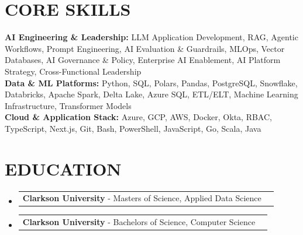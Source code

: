 \documentclass[letterpaper,11pt]{article}
\makeatletter
\newcommand{\educationSubheading}[3]{
  \vspace{-2pt}\item
    \begin{tabular*}{0.98\textwidth}[t]{l@{\extracolsep{\fill}}r}
      \textbf{\small#1} - {\small#2} & \textbf{\textit{\small#3}} \\
    \end{tabular*}\vspace{-7pt}
}
\makeatother
\begin{document}
\section{\textbf{CORE SKILLS}}
    \begin{itemize}[leftmargin=0.05in, label={}]
        \small{\item{
            \textbf{AI Engineering \& Leadership: }{LLM Application Development, RAG, Agentic Workflows, Prompt Engineering, AI Evaluation \& Guardrails, MLOps, Vector Databases, AI Governance \& Policy, Enterprise AI Enablement, AI Platform Strategy, Cross-Functional Leadership} \\
            \textbf{Data \& ML Platforms: }{Python, SQL, Polars, Pandas, PostgreSQL, Snowflake, Databricks, Apache Spark, Delta Lake, Azure SQL, ETL/ELT, Machine Learning Infrastructure, Transformer Models} \\
            \textbf{Cloud \& Application Stack: }{Azure, GCP, AWS, Docker, Okta, RBAC, TypeScript, Next.js, Git, Bash, PowerShell, JavaScript, Go, Scala, Java}
        }}
    \end{itemize}\vspace{-14pt}

\section{\textbf{EDUCATION}} 
    \begin{itemize}[leftmargin=0.05in, label={}]
        \educationSubheading{Clarkson University}{Masters of Science, Applied Data Science}{}
        \educationSubheading{Clarkson University}{Bachelors of Science, Computer Science}{}
    \end{itemize}


\end{document}
